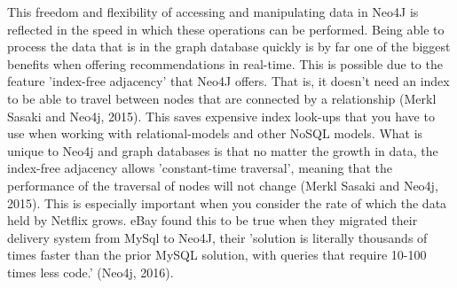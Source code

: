 \documentclass[a4paper]{article}
\begin{document}
This freedom and flexibility of accessing and manipulating data in Neo4J is reflected in the speed in which these operations can be performed. Being able to process the data that is in the graph database quickly is by far one of the biggest benefits when offering recommendations in real-time. This is possible due to the feature 'index-free adjacency' that Neo4J offers. That is, it doesn't need an index to be able to travel between nodes that are connected by a relationship (Merkl Sasaki and Neo4j, 2015). This saves expensive index look-ups that you have to use when working with relational-models and other NoSQL models. What is unique to Neo4j and graph databases is that no matter the growth in data, the index-free adjacency allows 'constant-time traversal', meaning that the performance of the traversal of nodes will not change (Merkl Sasaki and Neo4j, 2015). This is especially important when you consider the rate of which the data held by Netflix grows. eBay found this to be true when they migrated their delivery system from MySql to Neo4J, their 'solution is literally thousands of times faster than the prior MySQL solution, with queries that require 10-100 times less code.' (Neo4j, 2016). \par
\end{document}
